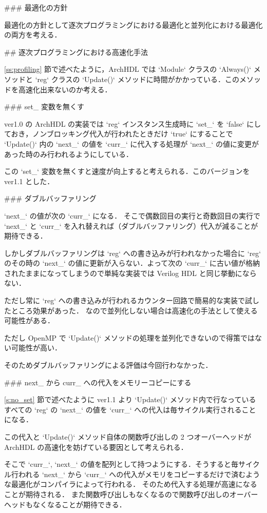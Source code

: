 ### 最適化の方針

最適化の方針として逐次プログラミングにおける最適化と並列化における最適化の両方を考える．


## 逐次プログラミングにおける高速化手法

\ref{ss:profiling} 節で述べたように，ArchHDL では
`Module` クラスの `Always()` メソッドと
`reg` クラスの `Update()` メソッドに時間がかかっている．このメソッドを高速化出来ないのか考える．


### set_ 変数を無くす \label{s:no_set}

ver1.0 の ArchHDL の実装では `reg` インスタンス生成時に `set_` を `false`
にしておき，ノンブロッキング代入が行われたときだけ `true` にすることで
`Update()` 内の `next_` の値を `curr_`
に代入する処理が `next_` の値に変更があった時のみ行われるようにしている．

この `set_` 変数を無くすと速度が向上すると考えられる．このバージョンを
ver1.1 とした．




### ダブルバッファリング

`next_` の値が次の `curr_` になる．
そこで偶数回目の実行と奇数回目の実行で `next_` と `curr_`
を入れ替えれば（ダブルバッファリング）代入が減ることが期待できる．

しかしダブルバッファリングは `reg` への書き込みが行われなかった場合に
`reg` のその時の `next_` の値に更新が入らない．よって次の
`curr_` に古い値が格納されたままになってしまうので単純な実装では Verilog HDL と同じ挙動にならない．

ただし常に `reg` への書き込みが行われるカウンター回路で簡易的な実装で試したところ効果があった．
なので並列化しない場合は高速化の手法として使える可能性がある．

ただし OpenMP で `Update()` メソッドの処理を並列化できないので得策ではない可能性が高い．

そのためダブルバッファリングによる評価は今回行わなかった．


### next_ から curr_ への代入をメモリーコピーにする

\ref{s:no_set} 節で述べたように ver1.1 より
`Update()` メソッド内で行なっているすべての `reg` の `next_`
の値を `curr_` への代入は毎サイクル実行されることになる．

この代入と `Update()` メソッド自体の関数呼び出しの
2 つオーバーヘッドが ArchHDL の高速化を妨げている要因として考えられる．

そこで `curr_`, `next_`
の値を配列として持つようにする．そうすると毎サイクル行われる `next_` から `curr_`
への代入がメモリをコピーするだけで済むような最適化がコンパイラによって行われる．
そのため代入する処理が高速になることが期待される．
また関数呼び出しもなくなるので関数呼び出しのオーバーヘッドもなくなることが期待できる．

